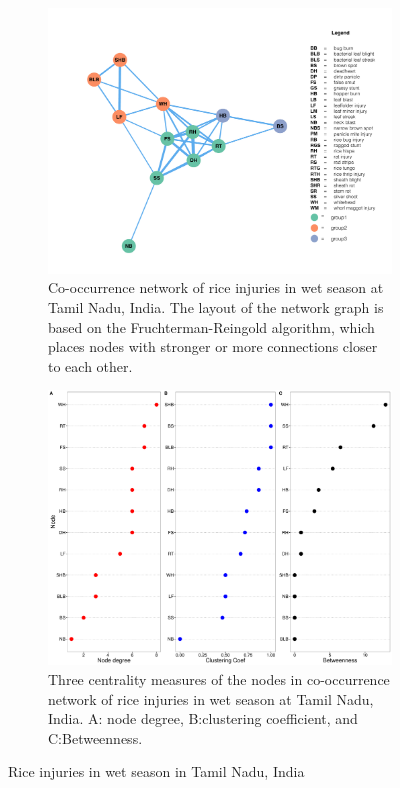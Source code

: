 \begin{figure}
    \centering
    \begin{subfigure}[b]{1\textwidth}
        \includegraphics[width = 1\textwidth]{figures/networkTM_ws/networkTM_ws.pdf}
        \caption{Co-occurrence network of rice injuries in wet season at Tamil Nadu, India. The layout of the network graph is based on the Fruchterman-Reingold algorithm, which places nodes with stronger or more connections closer to each other.}
        \label{fig:networkTM_ws}
    \end{subfigure}
    \begin{subfigure}[b]{1\textwidth}
        \includegraphics[width = 1\textwidth]{figures/nodepropTM_ws/nodepropTM_ws.pdf}
        \caption{Three centrality measures of the nodes in co-occurrence network of rice injuries in wet season at Tamil Nadu, India. A: node degree, B:clustering coefficient, and C:Betweenness.}
        \label{fig:nodepropTM_ws}
    \end{subfigure}
    \caption{Rice injuries in wet season in Tamil Nadu, India}
    \label{fig:TM_ws}
\end{figure}

